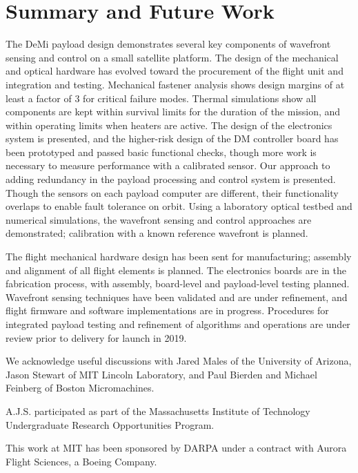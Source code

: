 \documentclass[]{spie}  %
\begin{document}
\section{Summary and Future Work}
\label{sec:summary_and_future}
The DeMi payload design demonstrates several key components of wavefront sensing and control on a small satellite platform.
The design of the mechanical and optical hardware has evolved toward the procurement of the flight unit and integration and testing. Mechanical fastener analysis shows design margins of at least a factor of 3 for critical failure modes. Thermal simulations show all components are kept within survival limits for the duration of the mission, and within operating limits when heaters are active.
The design of the electronics system is presented, and the higher-risk design of the DM controller board has been prototyped and passed basic functional checks, though more work is necessary to measure performance with a calibrated sensor. 
Our approach to adding redundancy in the payload processing and control system is presented. Though the sensors on each payload computer are different, their functionality overlaps to enable fault tolerance on orbit.
Using a laboratory optical testbed and numerical simulations, the wavefront sensing and control approaches are demonstrated; calibration with a known reference wavefront is planned. 


The flight mechanical hardware design has been sent for manufacturing; assembly and alignment of all flight elements is planned. The electronics boards are in the fabrication process, with assembly, board-level and payload-level testing planned. Wavefront sensing techniques have been validated and are under refinement, and flight firmware and software implementations are in progress. Procedures for integrated payload testing and refinement of algorithms and operations are under review prior to delivery for launch in 2019.

\acknowledgments %
We acknowledge useful discussions with Jared Males of the University of Arizona, Jason Stewart of MIT Lincoln Laboratory, and Paul Bierden and Michael Feinberg of Boston Micromachines. 
 
A.J.S. participated as part of the Massachusetts Institute of Technology Undergraduate Research Opportunities Program.

This work at MIT has been sponsored by DARPA  under a contract with Aurora Flight Sciences, a Boeing Company.



\end{document}
